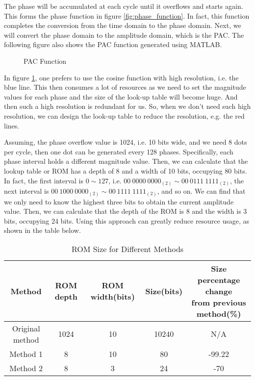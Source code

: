 The phase will be accumulated at each cycle until it overflows and starts again. This forms the phase function in figure \ref{fig:phase_function}. In fact, this function completes the conversion from the time domain to the phase domain. Next, we will convert the phase domain to the amplitude domain, which is the PAC. The following figure also shows the PAC function generated using MATLAB.

\begin{figure}[!htbp]
    \centering
    
    \caption{PAC Function}
    \label{fig:PAC_function}
\end{figure}

In figure \ref{fig:PAC_function}, one prefers to use the cosine function with high resolution, i.e. the blue line. This then consumes a lot of resources as we need to set the magnitude values for each phase and the size of the look-up table will become huge. And then such a high resolution is redundant for us. So, when we don't need such high resolution, we can  design the look-up table to reduce the resolution, e.g. the red lines.

Assuming, the phase overflow value is \num{1024}, i.e. 10 bits wide, and we need 8 dots per cycle, then one dot can be generated every 128 phases. Specifically, each phase interval holds a different magnitude value. Then, we can calculate that the lookup table or ROM has a depth of 8 and a width of 10 bits, occupying 80 bits.
In fact, the first interval is $0\sim127$, i.e. $00\ 0000\ 0000_{(2)}\sim00\  0111\ 1111_{(2)}$, the next interval is $00\ 1000\ 0000_{(2)}\sim00\ 1111\ 1111_{(2)}$, and so on. We can find that we only need to know the highest three bits to obtain the current amplitude value. Then, we can calculate that the depth of the ROM is 8 and the width is 3 bits, occupying 24 bits. Using this approach can greatly reduce resource usage, as shown in the table below.

\begin{table}[!htbp]
\centering
\caption{ROM Size for Different Methods}\label{tab:rom_size}
\renewcommand\arraystretch{1.5}
\begin{tabular}{ccccc}
    \toprule
    Method & ROM depth & ROM width(bits) & Size(bits) & \thead{Size percentage change\\from previous method(\%)} \\
    \midrule
    Original method & 1024 & 10 & 10240 & N/A \\
    Method 1 & 8 & 10 & 80 & -99.22 \\
    Method 2 & 8 & 3 & 24 & -70 \\
    \bottomrule
\end{tabular}
\end{table}

